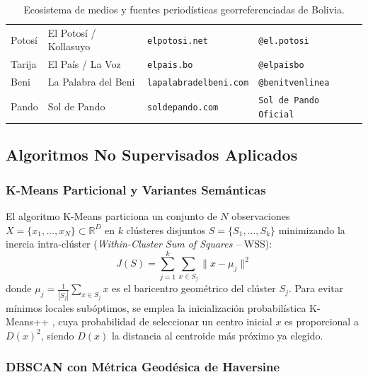 \begin{table}[htbp]
{\begin{tabular}{l p{3.6cm} l l}
Potosí & El Potosí / Kollasuyo & \texttt{elpotosi.net} & \texttt{@el.potosi} \\
Tarija & El País / La Voz & \texttt{elpais.bo} & \texttt{@elpaisbo} \\
Beni & La Palabra del Beni & \texttt{lapalabradelbeni.com} & \texttt{@benitvenlinea} \\
Pando & Sol de Pando & \texttt{soldepando.com} & \texttt{Sol de Pando Oficial} \\
\bottomrule
\end{tabular}%
}
\caption{Ecosistema de medios y fuentes periodísticas georreferenciadas de Bolivia.}
\label{tab:medios_bolivia}
\end{table}

\subsection{Algoritmos No Supervisados Aplicados}

\subsubsection{K-Means Particional y Variantes Semánticas}

El algoritmo K-Means particiona un conjunto de $N$ observaciones $X = \{x_1, \dots, x_N\} \subset \mathbb{R}^D$ en $k$ clústeres disjuntos $S = \{S_1, \dots, S_k\}$ minimizando la inercia intra-clúster (\textit{Within-Cluster Sum of Squares} -- WSS):
\begin{equation}
    J(S) = \sum_{j=1}^k \sum_{x \in S_j} \| x - \mu_j \|^2
\end{equation}
donde $\mu_j = \frac{1}{|S_j|} \sum_{x \in S_j} x$ es el baricentro geométrico del clúster $S_j$. Para evitar mínimos locales subóptimos, se emplea la inicialización probabilística K-Means++ \cite{arthur2007}, cuya probabilidad de seleccionar un centro inicial $x$ es proporcional a $D(x)^2$, siendo $D(x)$ la distancia al centroide más próximo ya elegido.

\subsubsection{DBSCAN con Métrica Geodésica de Haversine}

